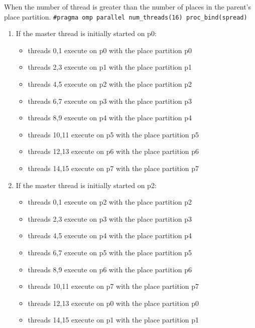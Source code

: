 \documentclass[11pt]{article}
\begin{document}
\begin{enumerate}
When the number of thread is greater than the number of places in the parent's place partition.
\texttt{\#pragma omp parallel num\_threads(16) proc\_bind(spread)}
\begin{enumerate}
\item If the master thread is initially started on p0:
\begin{itemize}
\item threads 0,1 execute on p0 with the place partition p0
\item threads 2,3 execute on p1 with the place partition p1
\item threads 4,5 execute on p2 with the place partition p2
\item threads 6,7 execute on p3 with the place partition p3
\item threads 8,9 execute on p4 with the place partition p4
\item threads 10,11 execute on p5 with the place partition p5
\item threads 12,13 execute on p6 with the place partition p6
\item threads 14,15 execute on p7 with the place partition p7
\end{itemize}
\item If the master thread is initially started on p2:
\begin{itemize}
\item threads 0,1 execute on p2 with the place partition p2
\item threads 2,3 execute on p3 with the place partition p3
\item threads 4,5 execute on p4 with the place partition p4
\item threads 6,7 execute on p5 with the place partition p5
\item threads 8,9 execute on p6 with the place partition p6
\item threads 10,11 execute on p7 with the place partition p7
\item threads 12,13 execute on p0 with the place partition p0
\item threads 14,15 execute on p1 with the place partition p1
\end{itemize}
\end{enumerate}


\end{enumerate}
\end{document}
